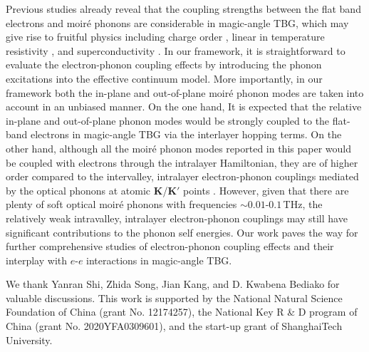 \documentclass[aps,prx,10pt,twocolumn,superscriptaddress]{revtex4}
\begin{document}
Previous studies already reveal that  
the coupling strengths between the flat band electrons and moir\'e phonons are considerable in magic-angle TBG,  which may give rise to fruitful physics including charge order \cite{angeli-tbg-prx19,liu-phonon-nano22}, linear in temperature resistivity \cite{wu-linear-prb19,sharma-tbg-phonon-nc21}, and superconductivity \cite{lian-prl18,wu-prl18,choi-tbg-prl21,liu-bernevig-Kphonon-arxiv23}. In our framework, it is straightforward to evaluate the electron-phonon coupling effects by introducing the phonon excitations into the effective continuum model. More importantly, in our framework both the in-plane and out-of-plane moir\'e phonon modes are taken into account in an unbiased manner. 
On the one hand, It is expected that the relative in-plane and out-of-plane phonon modes would be strongly coupled to the flat-band electrons in magic-angle TBG via the interlayer hopping terms.
On the other hand, although all the moir\'e phonon modes reported in this paper  would be coupled with electrons through the intralayer  Hamiltonian,  they are of higher order compared to the intervalley, intralayer electron-phonon couplings mediated by the optical phonons at atomic $\mathbf{K}$/$\mathbf{K'}$ points \cite{liu-bernevig-Kphonon-arxiv23}.
However, given that there are plenty of soft optical moir\'e phonons with frequencies $\sim 0.01\textrm{-}0.1\,$THz, the relatively weak intravalley, intralayer electron-phonon couplings may still have significant contributions to the phonon self energies. 
Our work paves the way for further comprehensive studies of electron-phonon coupling effects and their interplay with $e$-$e$ interactions in magic-angle TBG.

\acknowledgements

We thank Yanran Shi, Zhida Song,  Jian Kang, and D. Kwabena Bediako for valuable discussions. This work is supported by the National Natural Science Foundation of China (grant No. 12174257), the National Key R \& D program of China (grant No. 2020YFA0309601),  and the start-up grant of ShanghaiTech University. 
\end{document}
